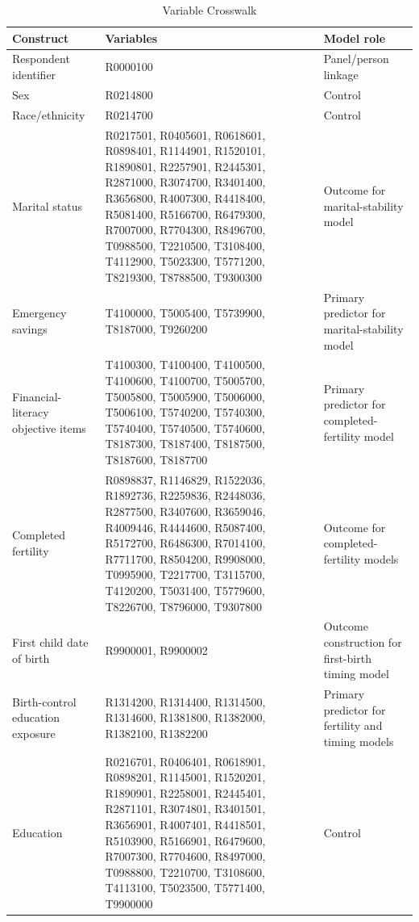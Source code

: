 \begin{table}

\caption{Variable Crosswalk}
\centering
\begin{tabular}[t]{lll}
\toprule
Construct & Variables & Model role\\
\midrule
Respondent identifier & R0000100 & Panel/person linkage\\
Sex & R0214800 & Control\\
Race/ethnicity & R0214700 & Control\\
Marital status & R0217501, R0405601, R0618601, R0898401, R1144901, R1520101, R1890801, R2257901, R2445301, R2871000, R3074700, R3401400, R3656800, R4007300, R4418400, R5081400, R5166700, R6479300, R7007000, R7704300, R8496700, T0988500, T2210500, T3108400, T4112900, T5023300, T5771200, T8219300, T8788500, T9300300 & Outcome for marital-stability model\\
Emergency savings & T4100000, T5005400, T5739900, T8187000, T9260200 & Primary predictor for marital-stability model\\
\addlinespace
Financial-literacy objective items & T4100300, T4100400, T4100500, T4100600, T4100700, T5005700, T5005800, T5005900, T5006000, T5006100, T5740200, T5740300, T5740400, T5740500, T5740600, T8187300, T8187400, T8187500, T8187600, T8187700 & Primary predictor for completed-fertility model\\
Completed fertility & R0898837, R1146829, R1522036, R1892736, R2259836, R2448036, R2877500, R3407600, R3659046, R4009446, R4444600, R5087400, R5172700, R6486300, R7014100, R7711700, R8504200, R9908000, T0995900, T2217700, T3115700, T4120200, T5031400, T5779600, T8226700, T8796000, T9307800 & Outcome for completed-fertility models\\
First child date of birth & R9900001, R9900002 & Outcome construction for first-birth timing model\\
Birth-control education exposure & R1314200, R1314400, R1314500, R1314600, R1381800, R1382000, R1382100, R1382200 & Primary predictor for fertility and timing models\\
Education & R0216701, R0406401, R0618901, R0898201, R1145001, R1520201, R1890901, R2258001, R2445401, R2871101, R3074801, R3401501, R3656901, R4007401, R4418501, R5103900, R5166901, R6479600, R7007300, R7704600, R8497000, T0988800, T2210700, T3108600, T4113100, T5023500, T5771400, T9900000 & Control\\
\bottomrule
\end{tabular}
\end{table}
